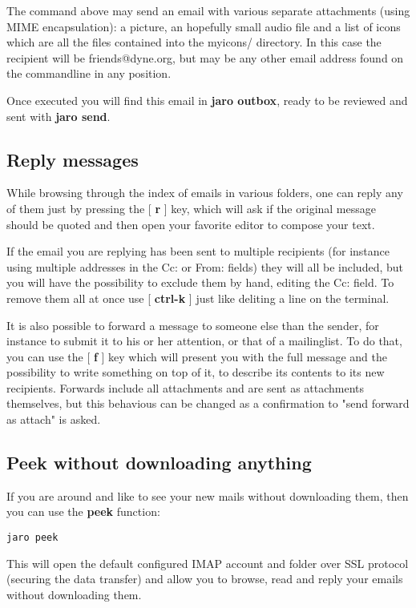 \documentclass[a4,onecolumn,portrait]{article}
\begin{document}
The command above may send an email with various separate attachments (using MIME encapsulation): a picture, an hopefully small audio file and a list of icons which are all the files contained into the myicons/ directory. In this case the recipient will be friends@dyne.org, but may be any other email address found on the commandline in any position.

Once executed you will find this email in \textbf{jaro outbox}, ready to be reviewed and sent with \textbf{jaro send}.
\subsection{Reply messages}
\label{sec-6-4}

While browsing through the index of emails in various folders, one can reply any of them just by pressing the [ \textbf{r} ] key, which will ask if
the original message should be quoted and then open your favorite editor to compose your text.

If the email you are replying has been sent to multiple recipients (for instance using multiple addresses in the Cc: or From: fields) they will all be included, but you will have the possibility to exclude them by hand, editing the Cc: field. To remove them all at once use [ \textbf{ctrl-k} ] just like deliting a line on the terminal.

It is also possible to forward a message to someone else than the sender, for instance to submit it to his or her attention, or that of a mailinglist. To do that, you can use the [ \textbf{f} ] key which will present you with the full message and the possibility to write something on top of it, to describe its contents to its new recipients. Forwards include all attachments and are sent as attachments themselves, but this behavious can be changed as a confirmation to "send forward as attach" is asked.
\subsection{Peek without downloading anything}
\label{sec-6-5}

If you are around and like to see your new mails without downloading
them, then you can use the \textbf{peek} function:

\begin{verbatim}
jaro peek
\end{verbatim}

This will open the default configured IMAP account and folder over SSL protocol (securing the data transfer) and allow you to browse, read and reply  your emails without downloading them.
\end{document}
